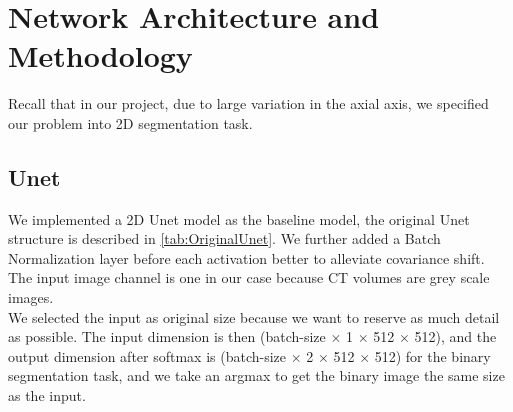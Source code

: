 \section{Network Architecture and Methodology}
Recall that in our project, due to large variation in the axial axis, we specified our problem into 2D segmentation task.\\

\subsection{Unet}
We implemented a 2D Unet model as the baseline model, the original Unet structure is described in \ref{tab:OriginalUnet}. We further added a Batch Normalization layer before each activation better to alleviate covariance shift. The input image channel is one in our case because CT volumes are grey scale images.\\

We selected the input as original size because we want to reserve as much detail as possible. 
The input dimension is then (batch-size $\times$ 1 $\times$ 512 $\times$ 512), and the output dimension after softmax is (batch-size $\times$ 2 $\times$ 512 $\times$ 512) for the binary segmentation task, and we take an argmax to get the binary image the same size as the input.\\

